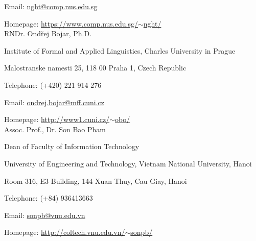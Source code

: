 \documentclass[9pt]{extreport}
\begin{document}
Email: \href{mailto:nght@comp.nus.edu.sg}{nght@comp.nus.edu.sg}

Homepage: \href{https://www.comp.nus.edu.sg/$\sim$nght/}{https://www.comp.nus.edu.sg/$\sim$nght/} \\
%

RNDr. Ond\v{r}ej Bojar, Ph.D.

Institute of Formal and Applied Linguistics, Charles University in Prague

Malostranske namesti 25, 118 00 Praha 1, Czech Republic

Telephone: (+420) 221 914 276

Email: \href{mailto:ondrej.bojar@mff.cuni.cz}{ondrej.bojar@mff.cuni.cz}

Homepage: \href{http://www1.cuni.cz/~obo/}{http://www1.cuni.cz/$\sim$obo/} \\
%

Assoc. Prof., Dr. Son Bao Pham 

Dean of Faculty of Information Technology

University of Engineering and Technology, Vietnam National University, Hanoi

Room 316, E3 Building, 144 Xuan Thuy, Cau Giay, Hanoi

Telephone: (+84) 936413663

Email: \href{mailto:sonpb@vnu.edu.vn}{sonpb@vnu.edu.vn}

Homepage: \href{http://coltech.vnu.edu.vn/\~sonpb/}{http://coltech.vnu.edu.vn/$\sim$sonpb/} \\ 

\bigskip




\end{document}
